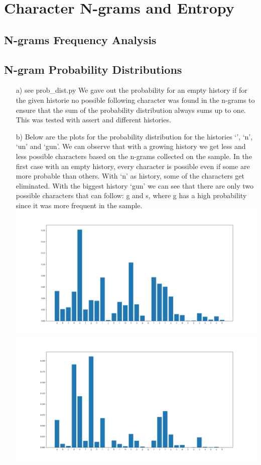 \documentclass{article}
\begin{document}
\section{Character N-grams and Entropy}
\subsection{N-grams Frequency Analysis}

\subsection{N-gram Probability Distributions}
\begin{itemize}
	\item[a)]
	see prob\_dist.py
    We gave out the probability for an empty history if for the given historie no possible following character was found in the n-grams to ensure that the sum of the probability distribution always sums up to one. This was tested with assert and different histories.
    \item[b)]Below are the plots for the probability distribution for the histories `', `n', `un' and `gun'. We can observe that with a growing history we get less and less possible characters based on the n-grams collected on the sample. In the first case with an empty history, every character is possible even if some are more probable than others. With `n' as history, some of the characters get eliminated. With the biggest history `gun' we can see that there are only two possible characters that can follow: g and s, where g has a high probability since it was more frequent in the sample.
    \includegraphics[width=\textwidth]{./plots/emptyhistory.png}
	\includegraphics[width=\textwidth]{./plots/nhistory.png}

\end{itemize}
\end{document}
